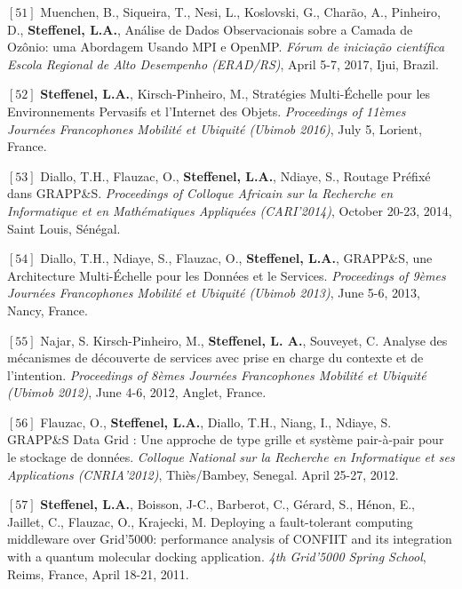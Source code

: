 \documentclass[final,twoside]{hdr} %
\begin{document}
\vspace{1em} \noindent $[51]$
Muenchen, B., Siqueira, T., Nesi, L., Koslovski, G., Charão, A., Pinheiro, D., \textbf{Steffenel, L.A.}, {Análise de Dados Observacionais sobre a Camada de Ozônio: uma Abordagem Usando MPI e OpenMP}. {\em Fórum de iniciação científica Escola Regional de Alto Desempenho (ERAD/RS)}, April 5-7, 2017, Ijui, Brazil.

\vspace{1em} \noindent $[52]$
\textbf{Steffenel, L.A.}, Kirsch-Pinheiro, M., {Stratégies Multi-Échelle pour les Environnements Pervasifs et l’Internet des Objets}. {\em Proceedings of 11èmes Journées Francophones Mobilité et Ubiquité (Ubimob 2016)}, July 5, Lorient, France.

\vspace{1em} \noindent $[53]$
Diallo, T.H., Flauzac, O., \textbf{Steffenel, L.A.}, Ndiaye, S., {Routage Préfixé dans GRAPP\&S}. {\em Proceedings of Colloque Africain sur la Recherche en Informatique et en Mathématiques Appliquées (CARI'2014)}, October 20-23, 2014, Saint Louis, Sénégal.

\vspace{1em} \noindent $[54]$
Diallo, T.H., Ndiaye, S., Flauzac, O., \textbf{Steffenel, L.A.}, {GRAPP\&S, une Architecture Multi-Échelle pour les Données et le Services}. {\em Proceedings of 9èmes Journées Francophones Mobilité et Ubiquité (Ubimob 2013)}, June 5-6, 2013, Nancy, France. 

\vspace{1em} \noindent $[55]$
Najar, S. Kirsch-Pinheiro, M., \textbf{Steffenel, L. A.}, Souveyet, C. {Analyse des mécanismes de découverte de services avec prise en charge du contexte et de l'intention}. {\em Proceedings of 8èmes Journées Francophones Mobilité et Ubiquité (Ubimob 2012)}, June 4-6, 2012, Anglet, France. 

\vspace{1em} \noindent $[56]$
Flauzac, O., \textbf{Steffenel, L.A.}, Diallo, T.H., Niang, I., Ndiaye, S. {GRAPP\&S Data Grid : Une approche de type grille et système pair-à-pair pour le stockage de données}. {\em Colloque National sur la Recherche en Informatique et ses Applications (CNRIA'2012)}, Thiès/Bambey, Senegal. April 25-27, 2012.

\vspace{1em} \noindent $[57]$
\textbf{Steffenel, L.A.}, Boisson, J-C., Barberot, C., Gérard, S., Hénon, E., Jaillet, C., Flauzac, O., Krajecki, M. {Deploying a fault-tolerant computing middleware over Grid’5000: performance analysis of CONFIIT and its integration with a quantum molecular docking application}. {\em 4th Grid'5000 Spring School}, Reims, France, April 18-21, 2011. 
\end{document}
